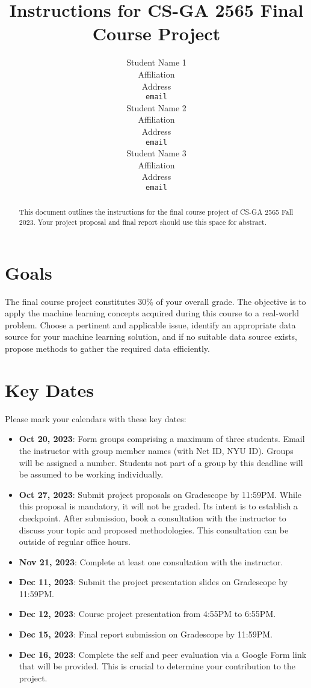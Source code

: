 \documentclass{article}
\title{Instructions for CS-GA 2565 Final Course Project}
\author{
  Student Name 1 \\
  Affiliation \\
  Address \\
  \texttt{email} \\
  \And
  Student Name 2 \\
  Affiliation \\
  Address \\
  \texttt{email} \\
  \And
  Student Name 3 \\
  Affiliation \\
  Address \\
  \texttt{email} \\
}
\begin{document}
\maketitle

\begin{abstract}
  This document outlines the instructions for the final course project of CS-GA 2565 Fall 2023. Your project proposal and final report should use this space for abstract.
\end{abstract}

\section{Goals}
The final course project constitutes 30\% of your overall grade. The objective is to apply the machine learning concepts acquired during this course to a real-world problem. Choose a pertinent and applicable issue, identify an appropriate data source for your machine learning solution, and if no suitable data source exists, propose methods to gather the required data efficiently.

\section{Key Dates}
Please mark your calendars with these key dates:
\begin{itemize}
  \item \textbf{Oct 20, 2023}: Form groups comprising a maximum of three students. Email the instructor with group member names (with Net ID, NYU ID). Groups will be assigned a number. Students not part of a group by this deadline will be assumed to be working individually.
  \item \textbf{Oct 27, 2023}: Submit project proposals on Gradescope by 11:59PM. While this proposal is mandatory, it will not be graded. Its intent is to establish a checkpoint. After submission, book a consultation with the instructor to discuss your topic and proposed methodologies. This consultation can be outside of regular office hours.
  \item \textbf{Nov 21, 2023}: Complete at least one consultation with the instructor.
  \item \textbf{Dec 11, 2023}: Submit the project presentation slides on Gradescope by 11:59PM.
  \item \textbf{Dec 12, 2023}: Course project presentation from 4:55PM to 6:55PM.
  \item \textbf{Dec 15, 2023}: Final report submission on Gradescope by 11:59PM.
  \item \textbf{Dec 16, 2023}: Complete the self and peer evaluation via a Google Form link that will be provided. This is crucial to determine your contribution to the project.
\end{itemize}
\end{document}
